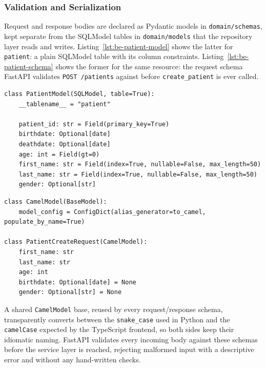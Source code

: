 \subsubsection*{Validation and Serialization}

Request and response bodies are declared as Pydantic models in \texttt{domain/schemas}, kept separate from the SQLModel tables in \texttt{domain/models} that the repository layer reads and writes. Listing~\ref{lst:be-patient-model} shows the latter for \texttt{patient}: a plain SQLModel table with its column constraints. Listing~\ref{lst:be-patient-schema} shows the former for the same resource: the request schema FastAPI validates \texttt{POST /patients} against before \texttt{create\_patient} is ever called.

\vspace{0.25cm}

\begin{lstlisting}[style=pythonstyle, caption={Domain model: the \texttt{patient} SQLModel table}, label={lst:be-patient-model}]
class PatientModel(SQLModel, table=True):
    __tablename__ = "patient"

    patient_id: str = Field(primary_key=True)
    birthdate: Optional[date]
    deathdate: Optional[date]
    age: int = Field(gt=0)
    first_name: str = Field(index=True, nullable=False, max_length=50)
    last_name: str = Field(index=True, nullable=False, max_length=50)
    gender: Optional[str]
\end{lstlisting}

\begin{lstlisting}[style=pythonstyle, caption={Domain schema: the patient-creation request}, label={lst:be-patient-schema}]
class CamelModel(BaseModel):
    model_config = ConfigDict(alias_generator=to_camel, populate_by_name=True)

class PatientCreateRequest(CamelModel):
    first_name: str
    last_name: str
    age: int
    birthdate: Optional[date] = None
    gender: Optional[str] = None
\end{lstlisting}

\noindent A shared \texttt{CamelModel} base, reused by every request/response schema, transparently converts between the \texttt{snake\_case} used in Python and the \texttt{camelCase} expected by the TypeScript frontend, so both sides keep their idiomatic naming. FastAPI validates every incoming body against these schemas before the service layer is reached, rejecting malformed input with a descriptive error and without any hand-written checks.

